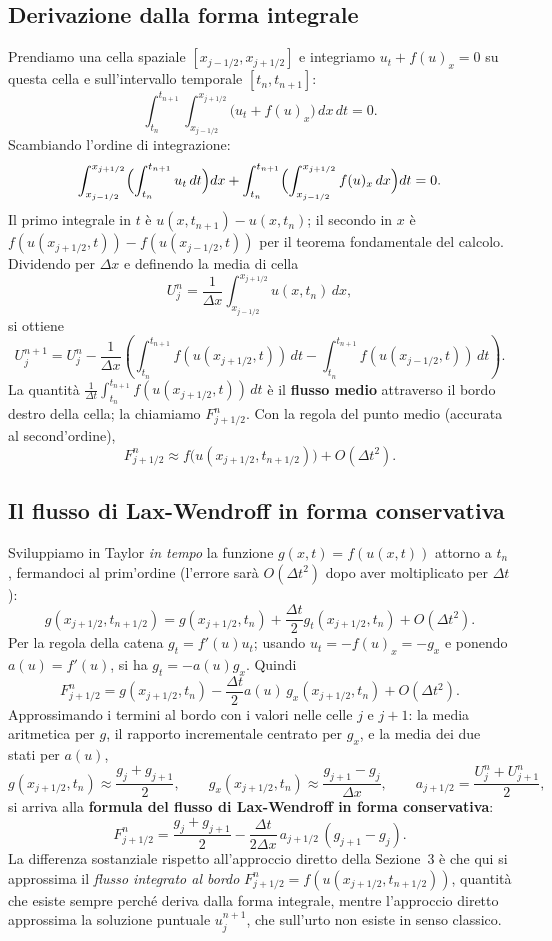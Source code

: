 \documentclass[12pt]{article}
\begin{document}
\subsection{Derivazione dalla forma integrale}

Prendiamo una cella spaziale $[x_{j-1/2},x_{j+1/2}]$ e integriamo $u_t+f(u)_x=0$ su questa cella e sull'intervallo temporale $[t_n,t_{n+1}]$:
\[
\int_{t_n}^{t_{n+1}}\int_{x_{j-1/2}}^{x_{j+1/2}} \bigl(u_t+f(u)_x\bigr)\,dx\,dt = 0.
\]
Scambiando l'ordine di integrazione:
\[
\int_{x_{j-1/2}}^{x_{j+1/2}}\Bigl(\int_{t_n}^{t_{n+1}} u_t\,dt\Bigr)dx + \int_{t_n}^{t_{n+1}}\Bigl(\int_{x_{j-1/2}}^{x_{j+1/2}} f(u)_x\,dx\Bigr)dt = 0.
\]
Il primo integrale in $t$ è $u(x,t_{n+1})-u(x,t_n)$; il secondo in $x$ è $f(u(x_{j+1/2},t))-f(u(x_{j-1/2},t))$ per il teorema fondamentale del calcolo. Dividendo per $\Delta x$ e definendo la media di cella
\[
U_j^n = \frac{1}{\Delta x}\int_{x_{j-1/2}}^{x_{j+1/2}} u(x,t_n)\,dx,
\]
si ottiene
\[
U_j^{n+1} = U_j^n - \frac{1}{\Delta x}\left(\int_{t_n}^{t_{n+1}} f(u(x_{j+1/2},t))\,dt - \int_{t_n}^{t_{n+1}} f(u(x_{j-1/2},t))\,dt\right).
\]
La quantità $\frac{1}{\Delta t}\int_{t_n}^{t_{n+1}} f(u(x_{j+1/2},t))\,dt$ è il \textbf{flusso medio} attraverso il bordo destro della cella; la chiamiamo $F_{j+1/2}^n$. Con la regola del punto medio (accurata al second'ordine),
\[
F_{j+1/2}^n \approx f\bigl(u(x_{j+1/2},t_{n+1/2})\bigr) + O(\Delta t^2).
\]

\newpage
\subsection{Il flusso di Lax-Wendroff in forma conservativa}

Sviluppiamo in Taylor \emph{in tempo} la funzione $g(x,t)=f(u(x,t))$ attorno a $t_n$, fermandoci al prim'ordine (l'errore sarà $O(\Delta t^2)$ dopo aver moltiplicato per $\Delta t$):
\[
g(x_{j+1/2},t_{n+1/2}) = g(x_{j+1/2},t_n) + \frac{\Delta t}{2}g_t(x_{j+1/2},t_n) + O(\Delta t^2).
\]
Per la regola della catena $g_t=f'(u)u_t$; usando $u_t=-f(u)_x=-g_x$ e ponendo $a(u)=f'(u)$, si ha $g_t=-a(u)g_x$. Quindi
\[
F_{j+1/2}^n = g(x_{j+1/2},t_n) - \frac{\Delta t}{2}a(u)\,g_x(x_{j+1/2},t_n) + O(\Delta t^2).
\]
Approssimando i termini al bordo con i valori nelle celle $j$ e $j+1$: la media aritmetica per $g$, il rapporto incrementale centrato per $g_x$, e la media dei due stati per $a(u)$,
\[
g(x_{j+1/2},t_n)\approx\frac{g_j+g_{j+1}}{2}, \qquad
g_x(x_{j+1/2},t_n)\approx\frac{g_{j+1}-g_j}{\Delta x}, \qquad
a_{j+1/2}=\frac{U_j^n+U_{j+1}^n}{2},
\]
si arriva alla \textbf{formula del flusso di Lax-Wendroff in forma conservativa}:
\[
F_{j+1/2}^n = \frac{g_j+g_{j+1}}{2} - \frac{\Delta t}{2\Delta x}\,a_{j+1/2}\,(g_{j+1}-g_j).
\]
La differenza sostanziale rispetto all'approccio diretto della Sezione~3 è che qui si approssima il \emph{flusso integrato al bordo} $F_{j+1/2}^n=f(u(x_{j+1/2},t_{n+1/2}))$, quantità che esiste sempre perché deriva dalla forma integrale, mentre l'approccio diretto approssima la soluzione puntuale $u_j^{n+1}$, che sull'urto non esiste in senso classico.
\end{document}

